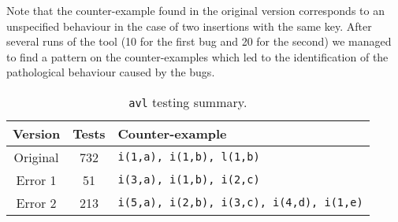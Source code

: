 \documentclass[runningheads,a4paper]{../../PaperStyles/llncs}
\newcommand{\yap}[1]{\lstinline[style=yap]{#1}}
\begin{document}
Note that the counter-example found in the original version corresponds
to an unspecified behaviour in the case of two insertions with the same key.
%
After several runs of the tool (10 for the first bug and 20 for the
second) we managed to find a pattern on the counter-examples which led
to the identification of the pathological behaviour caused by the bugs.


\begin{table}
  \centering
  \begin{tabular}{|c|c|l|}
    \hline
    Version    &  Tests   &  Counter-example
    \\ \hline
    Original   &  732     &  \yap{i(1,a), i(1,b), l(1,b)}
    \\ \hline
    Error 1    &  51      &  \yap{i(3,a), i(1,b), i(2,c)}
    \\ \hline
    Error 2    &  213     &  \yap{i(5,a), i(2,b), i(3,c), i(4,d), i(1,e)}
    \\ \hline
  \end{tabular}
  \caption{{\tt avl} testing summary.}
  \label{tab:avl-tests}
\end{table}





\end{document}
